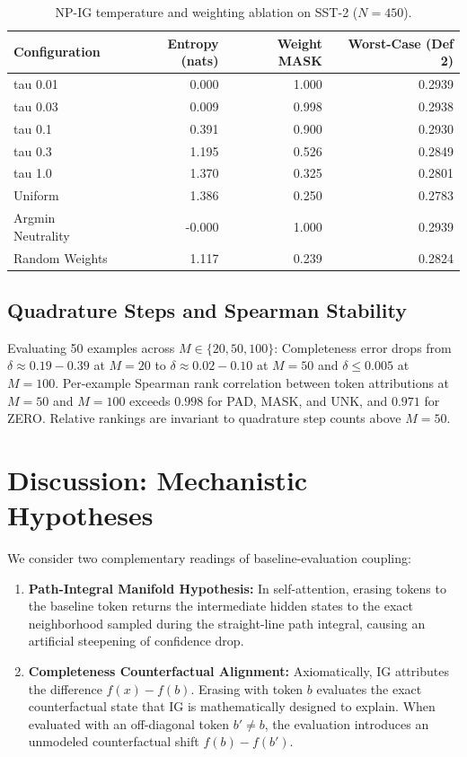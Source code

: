 \documentclass[11pt]{article}
\begin{document}
\begin{table}[t]
\centering
\small
\begin{tabular}{lrrr}
\toprule
\textbf{Configuration} & \textbf{Entropy (nats)} & \textbf{Weight MASK} & \textbf{Worst-Case (Def 2)} \\
\midrule
tau 0.01 & 0.000 & 1.000 & 0.2939 \\
tau 0.03 & 0.009 & 0.998 & 0.2938 \\
tau 0.1 & 0.391 & 0.900 & 0.2930 \\
tau 0.3 & 1.195 & 0.526 & 0.2849 \\
tau 1.0 & 1.370 & 0.325 & 0.2801 \\
Uniform & 1.386 & 0.250 & 0.2783 \\
Argmin Neutrality & -0.000 & 1.000 & 0.2939 \\
Random Weights & 1.117 & 0.239 & 0.2824 \\
\bottomrule
\end{tabular}
\caption{NP-IG temperature and weighting ablation on SST-2 ($N=450$).}
\label{tab:ablation}
\end{table}

\subsection{Quadrature Steps and Spearman Stability}
Evaluating 50 examples across $M \in \{20, 50, 100\}$:
Completeness error drops from $\delta \approx 0.19-0.39$ at $M=20$ to $\delta \approx 0.02-0.10$ at $M=50$ and $\delta \le 0.005$ at $M=100$. 
Per-example Spearman rank correlation between token attributions at $M=50$ and $M=100$ exceeds $\mathbf{0.998}$ for PAD, MASK, and UNK, and $0.971$ for ZERO. Relative rankings are invariant to quadrature step counts above $M=50$.

\section{Discussion: Mechanistic Hypotheses}
\label{sec:discussion}
We consider two complementary readings of baseline-evaluation coupling:
\begin{enumerate}
    \item \textbf{Path-Integral Manifold Hypothesis:} In self-attention, erasing tokens to the baseline token returns the intermediate hidden states to the exact neighborhood sampled during the straight-line path integral, causing an artificial steepening of confidence drop.
    \item \textbf{Completeness Counterfactual Alignment:} Axiomatically, IG attributes the difference $f(x) - f(b)$. Erasing with token $b$ evaluates the exact counterfactual state that IG is mathematically designed to explain. When evaluated with an off-diagonal token $b' \ne b$, the evaluation introduces an unmodeled counterfactual shift $f(b) - f(b')$.
\end{enumerate}
\end{document}
